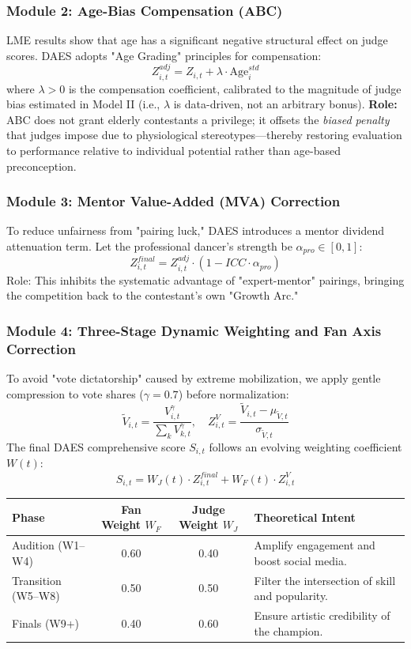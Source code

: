 \documentclass[12pt]{article}
\begin{document}
	\subsubsection{Module 2: Age-Bias Compensation (ABC)}
	LME results show that age has a significant negative structural effect on judge scores. DAES adopts "Age Grading" principles for compensation: 
	$$Z_{i,t}^{adj} = Z_{i,t} + \lambda \cdot \text{Age}_{i}^{std}$$
	where $\lambda > 0$ is the compensation coefficient, calibrated to the magnitude of judge bias estimated in Model II (i.e., $\lambda$ is data-driven, not an arbitrary bonus). \textbf{Role:} ABC does not grant elderly contestants a privilege; it offsets the \textit{biased penalty} that judges impose due to physiological stereotypes—thereby restoring evaluation to performance relative to individual potential rather than age-based preconception.
	
	\subsubsection{Module 3: Mentor Value-Added (MVA) Correction}
	To reduce unfairness from "pairing luck," DAES introduces a mentor dividend attenuation term. Let the professional dancer's strength be $\alpha_{pro} \in [0,1]$: 
	$$Z_{i,t}^{final} = Z_{i,t}^{adj} \cdot (1 - ICC \cdot \alpha_{pro})$$
	Role: This inhibits the systematic advantage of "expert-mentor" pairings, bringing the competition back to the contestant's own "Growth Arc."
	
	\subsubsection{Module 4: Three-Stage Dynamic Weighting and Fan Axis Correction}
	To avoid "vote dictatorship" caused by extreme mobilization, we apply gentle compression to vote shares ($\gamma = 0.7$) before normalization: 
	$$\tilde{V}_{i,t} = \frac{V_{i,t}^{\gamma}}{\sum_{k} V_{k,t}^{\gamma}}, \quad Z_{i,t}^V = \frac{\tilde{V}_{i,t} - \mu_{\tilde{V},t}}{\sigma_{\tilde{V},t}}$$
	The final DAES comprehensive score $S_{i,t}$ follows an evolving weighting coefficient $W(t)$: 
	$$S_{i,t} = W_J(t) \cdot Z_{i,t}^{final} + W_F(t) \cdot Z_{i,t}^V$$
	
	\begin{table}[htbp]
		\centering
		\small
		\begin{tabularx}{\linewidth}{lccX}
			\toprule
			Phase & Fan Weight $W_F$ & Judge Weight $W_J$ & Theoretical Intent \\
			\midrule
			Audition (W1–W4) & 0.60 & 0.40 & Amplify engagement and boost social media. \\
			Transition (W5–W8) & 0.50 & 0.50 & Filter the intersection of skill and popularity. \\
			Finals (W9+) & 0.40 & 0.60 & Ensure artistic credibility of the champion. \\
			\bottomrule
		\end{tabularx}
	\end{table}
	
\end{document}
